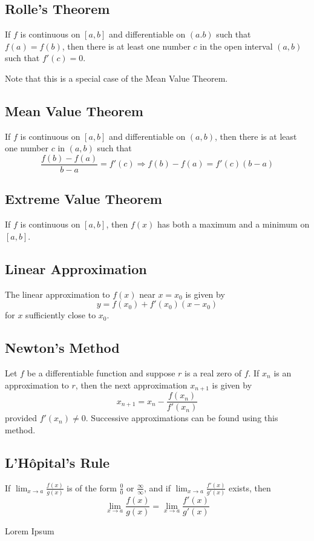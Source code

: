 \documentclass{artikel3}
\begin{document}
\subsection{Rolle's Theorem}
If $f$ is continuous on $[a,b]$ and differentiable on $(a.b)$ such that 
$f(a)=f(b)$, then there is at least one number $c$ in the open interval 
$(a,b)$ such that $f'(c)=0$.

Note that this is a special case of the Mean Value Theorem.

\subsection{Mean Value Theorem}
If $f$ is continuous on $[a,b]$ and differentiable on $(a,b)$, then there 
is at least one number $c$ in $(a,b)$ such that 
\[ \frac{f(b)-f(a)}{b-a}=f'(c)\Rightarrow f(b)-f(a)=f'(c)(b-a) \]

\subsection{Extreme Value Theorem}
If $f$ is continuous on $[a,b]$, then $f(x)$ has both a maximum and 
a minimum on $[a,b]$.

\subsection{Linear Approximation}
The linear approximation to $f(x)$ near $x=x_0$ is given by 
\[ y=f(x_0)+f'(x_0)(x-x_0) \]
for $x$ sufficiently close to $x_0$.

\subsection{Newton's Method}
Let $f$ be a differentiable function and suppose $r$ is a real zero of $f$.
If $x_n$ is an approximation to $r$, then the next approximation $x_{n+1}$ 
is given by
\[ x_{n+1}=x_n-\frac{f(x_n)}{f'(x_n)} \]
provided $f'(x_n)\neq 0$. Successive approximations can be found using this method.

\subsection{L'H\^{o}pital's Rule}
If $\displaystyle\lim_{x \to a}\frac{f(x)}{g(x)}$ is of the form $\frac{0}{0}$ 
or $\frac{\infty}{\infty}$, and if 
$\displaystyle\lim_{x \to a}\frac{f'(x)}{g'(x)}$ exists, then 
\[ \lim_{x \to a}\frac{f(x)}{g(x)}=\lim_{x \to a}\frac{f'(x)}{g'(x)} \]

Lorem Ipsum
\end{document}
